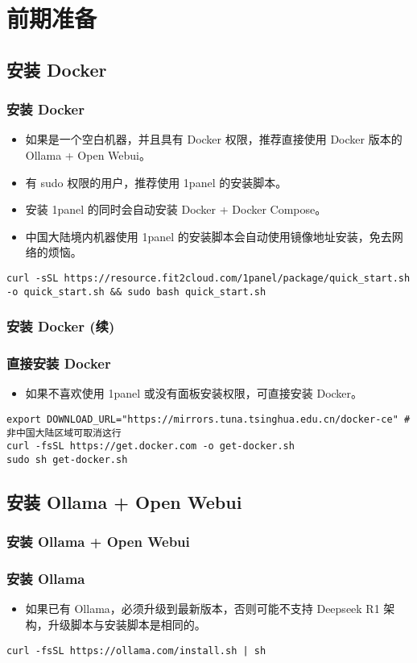 \section{前期准备}
\subsection{安装 Docker}

\begin{frame}[fragile]
	\frametitle{安装 Docker}
	\begin{itemize}
		\item 如果是一个空白机器，并且具有 Docker 权限，推荐直接使用 Docker 版本的 Ollama + Open Webui。
		\item 有 sudo 权限的用户，推荐使用 1panel 的安装脚本。
		\item 安装 1panel 的同时会自动安装 Docker + Docker Compose。
		\item 中国大陆境内机器使用 1panel 的安装脚本会自动使用镜像地址安装，免去网络的烦恼。
	\end{itemize}
	\begin{lstlisting}
curl -sSL https://resource.fit2cloud.com/1panel/package/quick_start.sh -o quick_start.sh && sudo bash quick_start.sh
\end{lstlisting}
\end{frame}


\begin{frame}[fragile]
	\frametitle{安装 Docker (续)}
	\subsubsection{直接安装 Docker}
	\begin{itemize}
		\item 如果不喜欢使用 1panel 或没有面板安装权限，可直接安装 Docker。
	\end{itemize}
	\begin{lstlisting}
export DOWNLOAD_URL="https://mirrors.tuna.tsinghua.edu.cn/docker-ce" # 非中国大陆区域可取消这行
curl -fsSL https://get.docker.com -o get-docker.sh
sudo sh get-docker.sh
\end{lstlisting}
\end{frame}

\subsection{安装 Ollama + Open Webui}

\begin{frame}[fragile]
	\frametitle{安装 Ollama + Open Webui}
	\subsubsection{安装 Ollama}
	\begin{itemize}
		\item 如果已有 Ollama，必须升级到最新版本，否则可能不支持 Deepseek R1 架构，升级脚本与安装脚本是相同的。
	\end{itemize}
	\begin{lstlisting}
curl -fsSL https://ollama.com/install.sh | sh
\end{lstlisting}
\end{frame}

